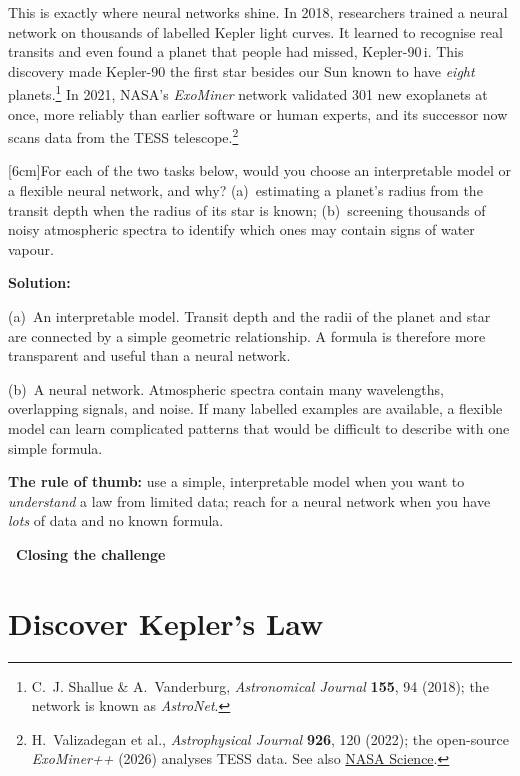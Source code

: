\documentclass[12pt]{article}
\makeatletter
\newcounter{question}
\newlength\questionheight
\newcommand{\question}{\@ifstar{\question@text}{\question@field}}
\newcommand{\question@heading}[1]{%
  \refstepcounter{question}%
  \vspace{0.3cm}%
  \noindent\textbf{\faEdit\ Question \thequestion: #1}%
}
\newcommand{\question@text}[1]{%
  \question@heading{#1}%
}
\newcommand{\question@field}[2][\questionheight]{%
  \question@heading{#2}%
 \\[0.3em] \begin{Form}
    \TextField[
      name=Q\thequestion,
      multiline=true,
      width=\linewidth,
      height=#1,
      charsize=10pt,
      bordercolor={0 0 0},
      borderwidth=1.8,
      backgroundcolor={1 1 1}
    ]{}
  \end{Form}
  \vspace{0.3cm}%
}
\newenvironment{solution}{%
  \begin{solutionbox}\textbf{Solution:}
}{%
  \end{solutionbox}
}
\makeatother
\begin{document}
This is exactly where neural networks shine. In 2018, researchers trained a neural network on thousands of labelled Kepler light curves. It learned to recognise real transits and even found a planet that people had missed, Kepler-90\,i. This discovery made Kepler-90 the first star besides our Sun known to have \emph{eight} planets.\footnote{C.~J. Shallue \& A.~Vanderburg, \emph{Astronomical Journal} \textbf{155}, 94 (2018); the network is known as \emph{AstroNet}.} In 2021, NASA's \emph{ExoMiner} network validated 301 new exoplanets at once, more reliably than earlier software or human experts, and its successor now scans data from the TESS telescope.\footnote{H.~Valizadegan et al., \emph{Astrophysical Journal} \textbf{926}, 120 (2022); the open-source \emph{ExoMiner++} (2026) analyses TESS data. See also \href{https://science.nasa.gov/universe/exoplanets/new-deep-learning-method-adds-301-planets-to-keplers-total-count/}{NASA Science}.}

\question[6cm]{For each of the two tasks below, would you choose an interpretable model or a flexible neural network, and why? \; (a)~estimating a planet's radius from the transit depth when the radius of its star is known; \; (b)~screening thousands of noisy atmospheric spectra to identify which ones may contain signs of water vapour.}

\begin{solution}

(a)~An interpretable model. Transit depth and the radii of the planet and star are connected by a simple geometric relationship. A formula is therefore more transparent and useful than a neural network.

(b)~A neural network. Atmospheric spectra contain many wavelengths, overlapping signals, and noise. If many labelled examples are available, a flexible model can learn complicated patterns that would be difficult to describe with one simple formula.

\textbf{The rule of thumb:} use a simple, interpretable model when you want to \emph{understand} a law from limited data; reach for a neural network when you have \emph{lots} of data and no known formula.
\end{solution}


\vspace{0.5cm}
\textcolor{accentcolor}{\textbf{\faLightbulb\ Closing the challenge}}

\section{Discover Kepler's Law}\label{sec:kepler}
\end{document}

